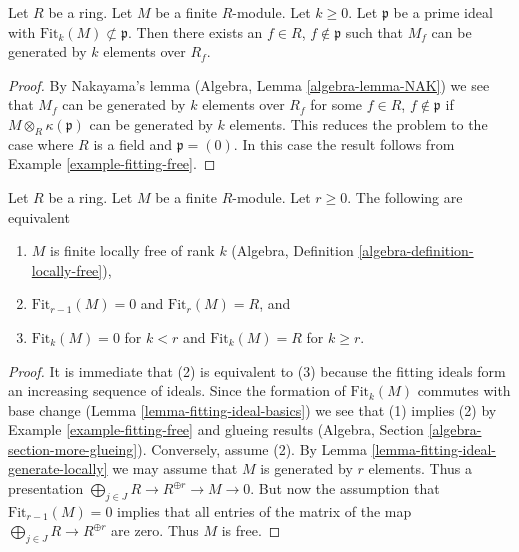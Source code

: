 \begin{lemma}
\label{lemma-fitting-ideal-generate-locally}
Let $R$ be a ring. Let $M$ be a finite $R$-module. Let $k \geq 0$.
Let $\mathfrak p$ be a prime ideal with
$\text{Fit}_k(M) \not \subset \mathfrak p$. Then there exists
an $f \in R$, $f \not \in \mathfrak p$ such that $M_f$ can be
generated by $k$ elements over $R_f$.
\end{lemma}

\begin{proof}
By Nakayama's lemma (Algebra, Lemma \ref{algebra-lemma-NAK}) we see that
$M_f$ can be generated by $k$ elements over $R_f$ for some
$f \in R$, $f \not \in \mathfrak p$ if $M \otimes_R \kappa(\mathfrak p)$
can be generated by $k$ elements. This reduces the problem to the
case where $R$ is a field and $\mathfrak p = (0)$. In this case
the result follows from Example \ref{example-fitting-free}.
\end{proof}

\begin{lemma}
\label{lemma-fitting-ideal-finite-locally-free}
Let $R$ be a ring. Let $M$ be a finite $R$-module. Let $r \geq 0$.
The following are equivalent
\begin{enumerate}
\item $M$ is finite locally free of rank $k$
(Algebra, Definition \ref{algebra-definition-locally-free}),
\item $\text{Fit}_{r - 1}(M) = 0$ and $\text{Fit}_r(M) = R$, and
\item $\text{Fit}_k(M) = 0$ for $k < r$ and $\text{Fit}_k(M) = R$
for $k \geq r$.
\end{enumerate}
\end{lemma}

\begin{proof}
It is immediate that (2) is equivalent to (3) because the fitting ideals
form an increasing sequence of ideals.
Since the formation of $\text{Fit}_k(M)$ commutes with base change
(Lemma \ref{lemma-fitting-ideal-basics}) we see that (1) implies (2) by
Example \ref{example-fitting-free}
and glueing results (Algebra, Section \ref{algebra-section-more-glueing}).
Conversely, assume (2). By
Lemma \ref{lemma-fitting-ideal-generate-locally} we may assume that $M$
is generated by $r$ elements. Thus a presentation
$\bigoplus_{j \in J} R \to R^{\oplus r} \to M \to 0$.
But now the assumption that $\text{Fit}_{r - 1}(M) = 0$ implies
that all entries of the matrix of the map
$\bigoplus_{j \in J} R \to R^{\oplus r}$ are zero.
Thus $M$ is free.
\end{proof}










